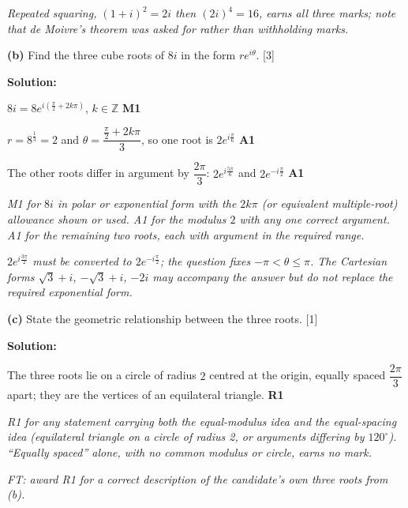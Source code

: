 \documentclass[12pt, twoside]{article}
\begin{document}
\begin{enumerate}[itemsep=0.3cm]
\emph{Repeated squaring, $(1+i)^2 = 2i$ then $(2i)^4 = 16$, earns all three
marks; note that de Moivre's theorem was asked for rather than withholding
marks.}

\medskip

\textbf{(b)} Find the three cube roots of $8i$ in the form $re^{i\theta}$.
\hfill [3]

\textbf{Solution:}

$8i = 8e^{i\left(\frac{\pi}{2} + 2k\pi\right)}$, $k \in \mathbb{Z}$
\hfill \textbf{M1}

$r = 8^{\frac13} = 2$ and $\theta = \dfrac{\frac{\pi}{2} + 2k\pi}{3}$, so
one root is $2e^{i\frac{\pi}{6}}$ \hfill \textbf{A1}

The other roots differ in argument by $\dfrac{2\pi}{3}$:
$2e^{i\frac{5\pi}{6}}$ and $2e^{-i\frac{\pi}{2}}$ \hfill \textbf{A1}

\emph{M1 for $8i$ in polar or exponential form with the $2k\pi$ (or
equivalent multiple-root) allowance shown or used. A1 for the modulus $2$
with any one correct argument. A1 for the remaining two roots, each with
argument in the required range.}

\emph{$2e^{i\frac{3\pi}{2}}$ must be converted to $2e^{-i\frac{\pi}{2}}$;
the question fixes $-\pi < \theta \leq \pi$. The Cartesian forms
$\sqrt{3}+i$, $-\sqrt{3}+i$, $-2i$ may accompany the answer but do not
replace the required exponential form.}

\medskip

\textbf{(c)} State the geometric relationship between the three roots.
\hfill [1]

\textbf{Solution:}

The three roots lie on a circle of radius $2$ centred at the origin,
equally spaced $\dfrac{2\pi}{3}$ apart; they are the vertices of an
equilateral triangle. \hfill \textbf{R1}

\emph{R1 for any statement carrying both the equal-modulus idea and the
equal-spacing idea (equilateral triangle on a circle of radius 2, or
arguments differing by $120^\circ$). ``Equally spaced'' alone, with no
common modulus or circle, earns no mark.}

\emph{FT: award R1 for a correct description of the candidate's own three
roots from (b).}

\end{enumerate}
\end{document}
